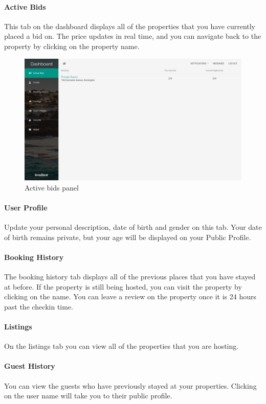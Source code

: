 \paragraph{Active Bids}
This tab on the dashboard displays all of the properties that you have currently
placed a bid on. The price updates in real time, and you can navigate back to
the property by clicking on the property name.
\begin{figure}[!h]
  \includegraphics[width=\linewidth]{assets/userManual/activeBids.png}
  \caption{Active bids panel}
  \label{fig:activeBids}
\end{figure}

\paragraph{User Profile}
Update your personal description, date of birth and gender on this tab. Your
date of birth remains private, but your age will be displayed on your Public
Profile.

\paragraph{Booking History}
The booking history tab displays all of the previous places that you have stayed
at before. If the property is still being hosted, you can visit the property by
clicking on the name.
You can leave a review on the property once it is 24 hours past the checkin time.

\paragraph{Listings}
On the listings tab you can view all of the properties that you are hosting.

\paragraph{Guest History}
You can view the guests who have previously stayed at your properties. Clicking
on the user name will take you to their public profile.

